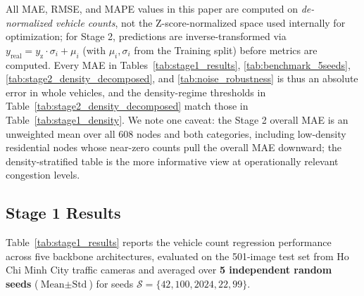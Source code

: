 \documentclass[preprint,12pt]{elsarticle}
\begin{document}
All MAE, RMSE, and MAPE values in this paper are computed on \emph{de-normalized vehicle counts}, not the Z-score-normalized space used internally for optimization; for Stage 2, predictions are inverse-transformed via $y_{\text{real}} = y_{\text{z}} \cdot \sigma_i + \mu_i$ (with $\mu_i, \sigma_i$ from the Training split) before metrics are computed. Every MAE in Tables~\ref{tab:stage1_results}, \ref{tab:benchmark_5seeds}, \ref{tab:stage2_density_decomposed}, and \ref{tab:noise_robustness} is thus an absolute error in whole vehicles, and the density-regime thresholds in Table~\ref{tab:stage2_density_decomposed} match those in Table~\ref{tab:stage1_density}. We note one caveat: the Stage 2 overall MAE is an unweighted mean over all 608 nodes and both categories, including low-density residential nodes whose near-zero counts pull the overall MAE downward; the density-stratified table is the more informative view at operationally relevant congestion levels.

\subsection{Stage 1 Results}
\label{sec:subproblem1_results}
Table~\ref{tab:stage1_results} reports the vehicle count regression performance across five backbone architectures, evaluated on the 501-image test set from Ho Chi Minh City traffic cameras and averaged over \textbf{5 independent random seeds} ($\text{Mean} \pm \text{Std}$) for seeds $\mathcal{S} = \{42, 100, 2024, 22, 99\}$.
\end{document}
